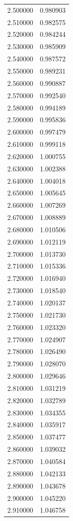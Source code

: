 \begin{tabular}{rr}
2.500000 & 0.980903 \\
2.510000 & 0.982575 \\
2.520000 & 0.984244 \\
2.530000 & 0.985909 \\
2.540000 & 0.987572 \\
2.550000 & 0.989231 \\
2.560000 & 0.990887 \\
2.570000 & 0.992540 \\
2.580000 & 0.994189 \\
2.590000 & 0.995836 \\
2.600000 & 0.997479 \\
2.610000 & 0.999118 \\
2.620000 & 1.000755 \\
2.630000 & 1.002388 \\
2.640000 & 1.004018 \\
2.650000 & 1.005645 \\
2.660000 & 1.007269 \\
2.670000 & 1.008889 \\
2.680000 & 1.010506 \\
2.690000 & 1.012119 \\
2.700000 & 1.013730 \\
2.710000 & 1.015336 \\
2.720000 & 1.016940 \\
2.730000 & 1.018540 \\
2.740000 & 1.020137 \\
2.750000 & 1.021730 \\
2.760000 & 1.023320 \\
2.770000 & 1.024907 \\
2.780000 & 1.026490 \\
2.790000 & 1.028070 \\
2.800000 & 1.029646 \\
2.810000 & 1.031219 \\
2.820000 & 1.032789 \\
2.830000 & 1.034355 \\
2.840000 & 1.035917 \\
2.850000 & 1.037477 \\
2.860000 & 1.039032 \\
2.870000 & 1.040584 \\
2.880000 & 1.042133 \\
2.890000 & 1.043678 \\
2.900000 & 1.045220 \\
2.910000 & 1.046758 \\

\end{tabular}
